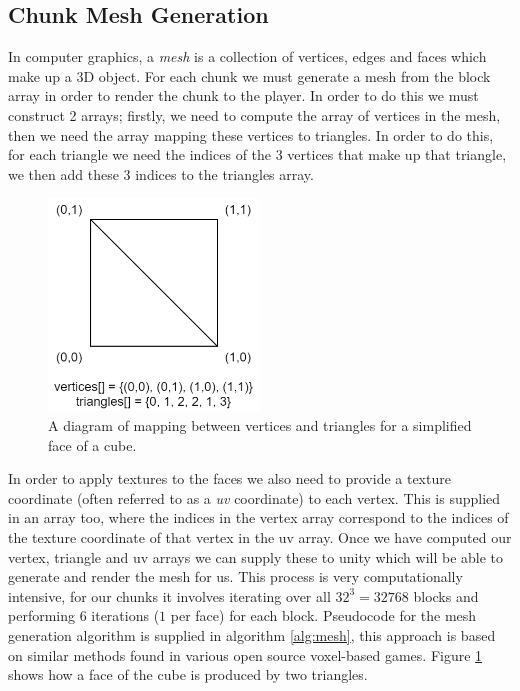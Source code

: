 \documentclass[10pt,twoside,notitlepage,a4paper]{report}
\begin{document}
	\subsection{Chunk Mesh Generation}
	\label{sec:mesh}
	In computer graphics, a \emph{mesh} is a collection of vertices, edges and faces which make up a 3D object. For each chunk we must generate a mesh from the block array in order to render the chunk to the player. In order to do this we must construct 2 arrays; firstly, we need to compute the array of vertices in the mesh, then we need the array mapping these vertices to triangles. In order to do this, for each triangle we need the indices of the 3 vertices that make up that triangle, we then add these 3 indices to the triangles array.
	
	\begin{figure}
		\centering
		\includegraphics[width=0.5\textwidth]{diag2.png}
		\caption{A diagram of mapping between vertices and triangles for a simplified face of a cube.}
		\label{fig:mesh}
	\end{figure}
	
	In order to apply textures to the faces we also need to provide a texture coordinate (often referred to as a \emph{uv} coordinate) to each vertex. This is supplied in an array too, where the indices in the vertex array correspond to the indices of the texture coordinate of that vertex in the uv array. Once we have computed our vertex, triangle and uv arrays we can supply these to unity which will be able to generate and render the mesh for us. This process is very computationally intensive, for our chunks it involves iterating over all $32^3 = 32768$ blocks and performing $6$ iterations ($1$ per face) for each block. Pseudocode for the mesh generation algorithm is supplied in algorithm \ref{alg:mesh}, this approach is based on similar methods found in various open source voxel-based games. Figure \ref{fig:mesh} shows how a face of the cube is produced by two triangles.
	
\end{document}
